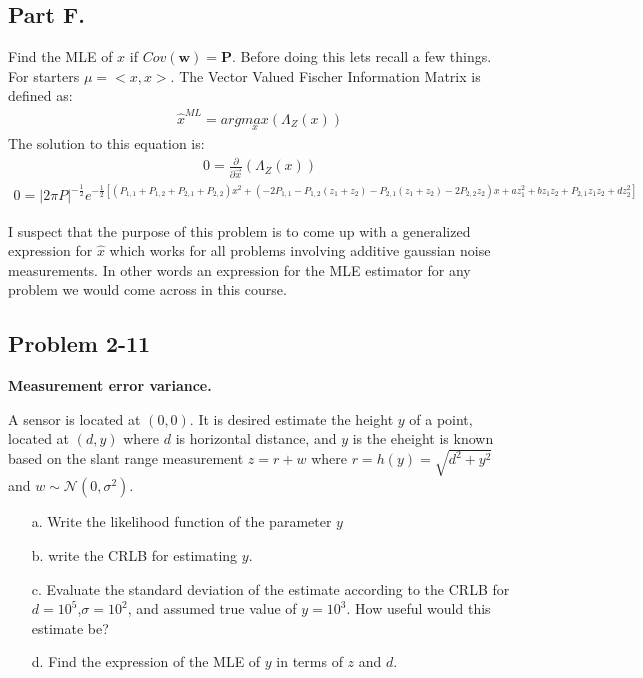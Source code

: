\documentclass{article}
\begin{document}
\clearpage

\subsection*{Part F.}
Find the MLE of $x$ if $Cov(\mathbf{w})=\mathbf{P}$. Before doing this lets recall a few things. For starters $\mu=<x,x>$. The Vector Valued Fischer Information Matrix is defined as:
\begin{align*}
\hat{x}^{ML} = arg \underset{x}{max} (\Lambda_Z(x))
\end{align*}
The solution to this equation is:
\begin{align*}
0 = \frac{\partial}{\partial \vec{x}}(\Lambda_Z(x))
\end{align*}
\begin{align*}
0 = |2\pi P|^{-\tfrac{1}{2}} e^{-\tfrac{1}{2} [(P_{1,1}+P_{1,2}+P_{2,1}+P_{2,2})x^2+(-2P_{1,1} - P_{1,2}(z_1+z_2) - P_{2,1}(z_1+z_2)-2P_{2,2}z_2)x+a z_1^2 + bz_1 z_2 + P_{2,1} z_1 z_2 + d z_2^2]}
\end{align*}

I suspect that the purpose of this problem is to come up with a generalized expression for $\hat{x}$ which works for all problems involving additive gaussian noise measurements. In other words an expression for the MLE estimator for any problem we would come across in this course.

\clearpage

\subsection{Problem 2-11}
\textbf{Measurement error variance.}

	A sensor is located at $(0,0)$. It is desired estimate the height $y$ of a point, located at $(d,y)$ where $d$ is horizontal distance, and $y$ is the eheight is known based on the slant range measurement $z=r+w$ where $r=h(y)=\sqrt{d^2+y^2}$ and $w\sim \mathcal{N}(0,\sigma^2)$.
\begin{enumerate}
\item[a.] Write the likelihood function of the parameter $y$
\item[b.] write the CRLB for estimating $y$.
\item[c.] Evaluate the standard deviation of the estimate according to the CRLB for $d=10^5$,$\sigma=10^2$, and assumed true value of $y=10^3$. How useful would this estimate be?
\item[d.] Find the expression of the MLE of $y$ in terms of $z$ and $d$.
\end{enumerate}
\end{document}

